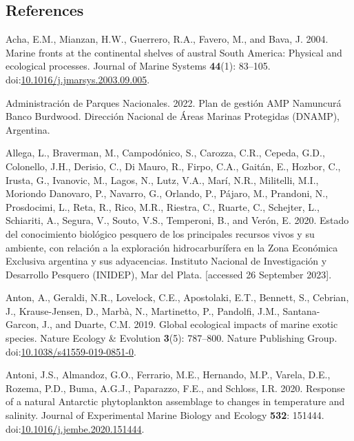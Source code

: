 \documentclass[
]{article}
\newlength{\cslhangindent}
\newenvironment{CSLReferences}[2] %
 {\begin{list}{}{%
  \setlength{\itemindent}{0pt}
  \setlength{\leftmargin}{0pt}
  \setlength{\parsep}{0pt}
  \ifodd #1
   \setlength{\leftmargin}{\cslhangindent}
   \setlength{\itemindent}{-1\cslhangindent}
  \fi
  \setlength{\itemsep}{#2\baselineskip}}}
 {\end{list}}
\begin{document}
\subsection*{References}\label{references}

\label{refs}
\begin{CSLReferences}{1}{0}
Acha, E.M., Mianzan, H.W., Guerrero, R.A., Favero, M., and Bava, J.
2004. Marine fronts at the continental shelves of austral {South
America}: {Physical} and ecological processes. Journal of Marine Systems
\textbf{44}(1): 83--105.
doi:\href{https://doi.org/10.1016/j.jmarsys.2003.09.005}{10.1016/j.jmarsys.2003.09.005}.

Administración de Parques Nacionales. 2022. {Plan de gesti{ó}n AMP
Namuncur{á} Banco Burdwood}. Direcci{ó}n Nacional de {Á}reas Marinas
Protegidas (DNAMP), Argentina.

Allega, L., Braverman, M., Campodónico, S., Carozza, C.R., Cepeda, G.D.,
Colonello, J.H., Derisio, C., Di Mauro, R., Firpo, C.A., Gaitán, E.,
Hozbor, C., Irusta, G., Ivanovic, M., Lagos, N., Lutz, V.A., Marí, N.R.,
Militelli, M.I., Moriondo Danovaro, P., Navarro, G., Orlando, P.,
Pájaro, M., Prandoni, N., Prosdocimi, L., Reta, R., Rico, M.R., Riestra,
C., Ruarte, C., Schejter, L., Schiariti, A., Segura, V., Souto, V.S.,
Temperoni, B., and Verón, E. 2020. {Estado del conocimiento biol{ó}gico
pesquero de los principales recursos vivos y su ambiente, con relaci{ó}n
a la exploraci{ó}n hidrocarbur{í}fera en la Zona Econ{ó}mica Exclusiva
argentina y sus adyacencias}. Instituto Nacional de Investigaci{ó}n y
Desarrollo Pesquero (INIDEP), Mar del Plata. {[}accessed 26 September
2023{]}.

Anton, A., Geraldi, N.R., Lovelock, C.E., Apostolaki, E.T., Bennett, S.,
Cebrian, J., Krause-Jensen, D., Marbà, N., Martinetto, P., Pandolfi,
J.M., Santana-Garcon, J., and Duarte, C.M. 2019. Global ecological
impacts of marine exotic species. Nature Ecology \& Evolution
\textbf{3}(5): 787--800. Nature Publishing Group.
doi:\href{https://doi.org/10.1038/s41559-019-0851-0}{10.1038/s41559-019-0851-0}.

Antoni, J.S., Almandoz, G.O., Ferrario, M.E., Hernando, M.P., Varela,
D.E., Rozema, P.D., Buma, A.G.J., Paparazzo, F.E., and Schloss, I.R.
2020. Response of a natural {Antarctic} phytoplankton assemblage to
changes in temperature and salinity. Journal of Experimental Marine
Biology and Ecology \textbf{532}: 151444.
doi:\href{https://doi.org/10.1016/j.jembe.2020.151444}{10.1016/j.jembe.2020.151444}.


\end{CSLReferences}
\end{document}
